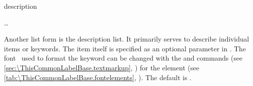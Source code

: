   \begin{Declaration}
    \begin{Environment}{description}
      \begin{Body}
         \dots
        \BodyDots
      \end{Body}
    \end{Environment}
  \end{Declaration}%
  Another list
  form is the description list. It primarily serves
  to describe individual items or keywords. The item itself is specified as an
  optional parameter in . %
  The font%
  \ used to format the keyword can be changed with the
   and
   commands (see
  \autoref{sec:\ThisCommonLabelBase.textmarkup},
  ) for the 
  element (see \autoref{tab:\ThisCommonLabelBase.fontelements},
  ). The default is
  \linebreak[1]%
  .%

